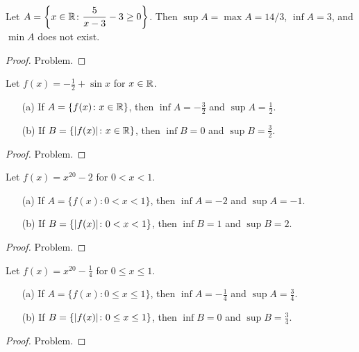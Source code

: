 \begin{exam}  Let $\displaystyle A = \left\{x \in \mathbb{R} \colon \frac5{x - 3} - 3 \ge 0\right\}$.  Then
$\sup A = \max A = 14/3$, $\inf A = 3$, and $\min A$ does not exist.
\end{exam}

\begin{proof} Problem.  \ns  \end{proof}

\begin{exam}  Let $f(x) = -\frac12 + \sin x$ for $x \in \mathbb{R}$.
 \begin{enumerate}
  \item[(a)] If $A = \{f(x) \colon x \in \mathbb{R}\}$, then $\inf A = -\frac32$ and $\sup A = \frac12$.
  \item[(b)] If $B = \{\lvert f(x)\rvert \colon x \in \mathbb{R}\}$, then $\inf B = 0$ and $\sup B = \frac32$.
 \end{enumerate}
\end{exam}

\begin{proof} Problem.  \ns  \end{proof}

\begin{exam}  Let $f(x) = x^{20} - 2$ for $0 < x < 1$.
 \begin{enumerate}
  \item[(a)] If $A = \{f(x) \colon 0 < x < 1\}$, then $\inf A = -2$ and $\sup A = -1$.
  \item[(b)] If $B = \{\lvert f(x)\rvert \colon 0 < x < 1\}$, then $\inf B = 1$ and $\sup B = 2$.
 \end{enumerate}
\end{exam}

\begin{proof} Problem.   \ns  \end{proof}

\begin{exam}  Let $f(x) = x^{20} - \frac14$ for $0 \le x \le 1$.
 \begin{enumerate}
  \item[(a)] If $A = \{f(x) \colon 0 \le x \le 1\}$, then $\inf A = -\frac14$ and $\sup A = \frac34$.
  \item[(b)] If $B = \{\lvert f(x)\rvert \colon 0 \le x \le 1\}$, then $\inf B = 0$ and $\sup B = \frac34$.
 \end{enumerate}
\end{exam}

\begin{proof} Problem.   \ns  \end{proof}

